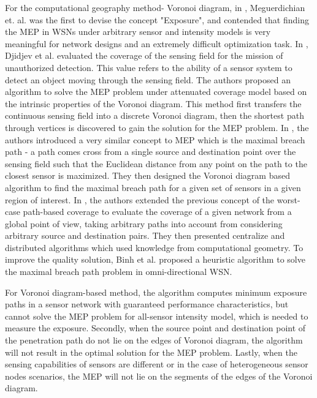 \documentclass[final]{elsarticle}
\begin{document}
For the computational geography method- Voronoi diagram, in \cite{meguerdichian2001exposure}, Meguerdichian et. al. was the first to devise the concept "Exposure", and contended that finding the MEP in WSNs under arbitrary sensor and intensity models is very meaningful for network designs and an extremely difficult optimization task. In \cite{djidjev2010approximation}, Djidjev et al. evaluated the coverage of the sensing field for the mission of unauthorized detection. This value refers to the ability of a sensor system to detect an object moving through the sensing field. The authors proposed an algorithm to solve the MEP problem under attenuated coverage model based on the intrinsic properties of the Voronoi diagram. This method first transfers the continuous sensing field into a discrete Voronoi diagram, then the shortest path through vertices is discovered to gain the solution for the MEP problem. In \cite{megerian2005worst}, the authors introduced a very similar concept to MEP which is the maximal breach path - a path comes cross from a single source and destination point over the sensing field such that the Euclidean distance from any point on the path to the closest sensor is maximized. They then designed the Voronoi diagram based algorithm to find the maximal breach path for a given set of sensors in a given region of interest. In \cite{lee2013best}, the authors  extended the previous concept of the worst-case path-based coverage to evaluate the coverage of a given network from a global point of view, taking arbitrary paths into account from considering arbitrary source and destination pairs. They then presented centralize and distributed algorithms which used knowledge from computational geometry. To improve the quality solution, Binh et al. \cite{binh2016heuristic} proposed a heuristic algorithm to solve the maximal breach path problem in omni-directional WSN.

For Voronoi diagram-based method, the algorithm computes minimum exposure paths in a sensor network with guaranteed performance characteristics, but cannot solve the MEP problem for all-sensor intensity model, which is needed to measure the exposure. Secondly,
when the source point and destination point of the penetration
path do not lie on the edges of Voronoi diagram, the algorithm
will not result in the optimal solution for the MEP problem. Lastly,
when the sensing capabilities of sensors are different or in the case of heterogeneous sensor nodes scenarios, the MEP will not lie on the segments of the edges of the Voronoi diagram.
\end{document}
